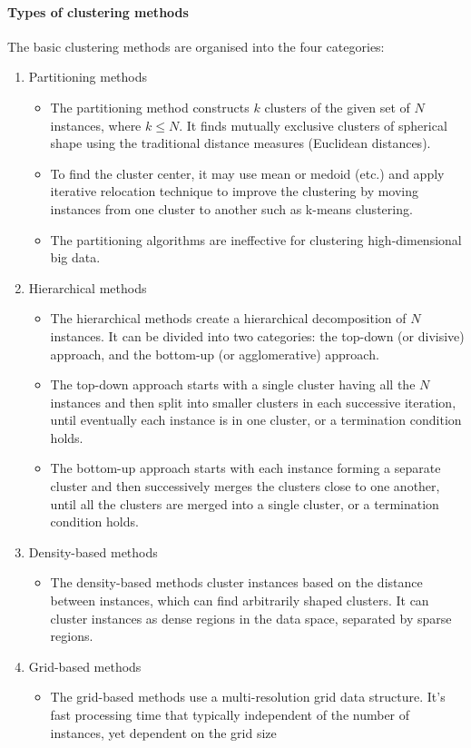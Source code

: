 \paragraph{Types of clustering methods}
The basic clustering methods are organised into the four categories:
\begin{enumerate}
    \item Partitioning methods
    \begin{itemize}
        \item The partitioning method constructs $k$ clusters of the given set of $N$
instances, where $k \leq N$. It finds mutually exclusive clusters of spherical shape using the traditional distance measures (Euclidean
distances).
        \item To find the cluster center, it may use mean or medoid (etc.) and apply iterative relocation technique to improve the clustering by moving instances from one cluster to another such as k-means
clustering.
        \item The partitioning algorithms are ineffective for clustering high-dimensional big data.
    \end{itemize}
    \item Hierarchical methods
    \begin{itemize}
        \item The hierarchical methods create a hierarchical decomposition of $N$ instances. It can be divided into two categories: the top-down (or divisive) approach, and the bottom-up (or agglomerative) approach.
        \item  The top-down approach starts with a single cluster having all the $N$ instances and then split into smaller clusters in each successive iteration, until eventually each instance is in one cluster, or a termination condition holds.
        \item The bottom-up approach starts with each instance forming a separate cluster and then successively merges the clusters close to one another, until all the clusters are merged into a single cluster, or a termination condition holds.
    \end{itemize}
    \item Density-based methods
    \begin{itemize}
        \item The density-based methods cluster instances based on the distance between instances, which can find arbitrarily shaped clusters. It can cluster instances as dense regions in the data space, separated by sparse regions.
    \end{itemize}
    \item Grid-based methods
    \begin{itemize}
        \item The grid-based methods use a multi-resolution grid data structure. It’s fast processing time that typically independent of the number of instances, yet dependent on the grid size        
    \end{itemize}
\end{enumerate}

